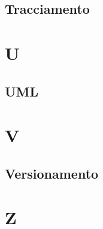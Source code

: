 \documentclass[12pt]{article}
\begin{document}
		\subsection{Tracciamento}
	\clearpage
	\section{U}
		\subsection{UML}
	\clearpage
	\section{V}
		\subsection{Versionamento}
	\clearpage
	\section{Z}	
\end{document}

